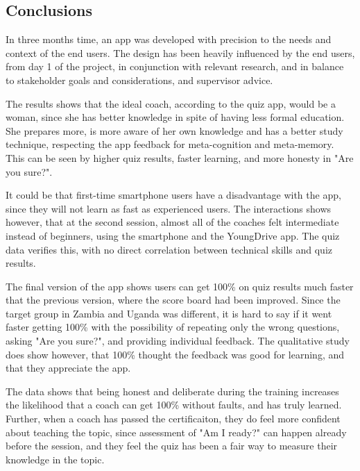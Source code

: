 \subsection{Conclusions}


In three months time, an app was developed with precision to the needs and context of the end users. The design has been heavily influenced by the end users, from day 1 of the project, in conjunction with relevant research, and in balance to stakeholder goals and considerations, and supervisor advice.

The results shows that the ideal coach, according to the quiz app, would be a woman, since she has better knowledge in spite of having less formal education. She prepares more, is more aware of her own knowledge and has a better study technique, respecting the app feedback for meta-cognition and meta-memory. This can be seen by higher quiz results, faster learning, and more honesty in "Are you sure?".

It could be that first-time smartphone users have a disadvantage with the app, since they will not learn as fast as experienced users. The interactions shows however, that at the second session, almost all of the coaches felt intermediate instead of beginners, using the smartphone and the YoungDrive app. The quiz data verifies this, with no direct correlation between technical skills and quiz results.

The final version of the app shows users can get 100\% on quiz results much faster that the previous version, where the score board had been improved. Since the target group in Zambia and Uganda was different, it is hard to say if it went faster getting 100\% with the possibility of repeating only the wrong questions, asking "Are you sure?", and providing individual feedback. The qualitative study does show however, that 100\% thought the feedback was good for learning, and that they appreciate the app.

The data shows that being honest and deliberate during the training increases the likelihood that a coach can get 100\% without faults, and has truly learned. Further, when a coach has passed the certificaiton, they do feel more confident about teaching the topic, since assessment of "Am I ready?" can happen already before the session, and they feel the quiz has been a fair way to measure their knowledge in the topic.
